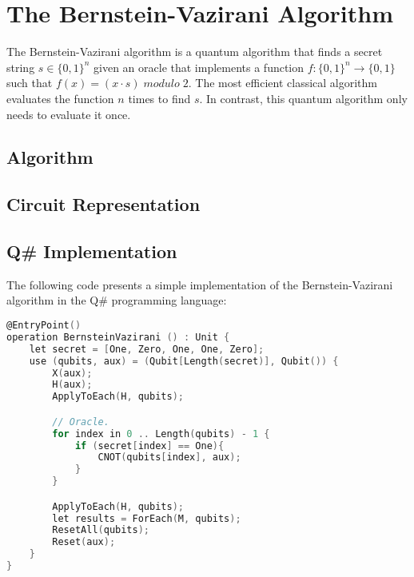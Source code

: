 %
%
\chapter {The Bernstein-Vazirani Algorithm}

The Bernstein-Vazirani algorithm\cite{BernsteinVazirani_1997} is a quantum algorithm that finds a secret string $s \in \{0, 1\}^n$ given an oracle that implements a function $f:\{0, 1\}^n \rightarrow \{0, 1\}$ such that $f(x) = (x \cdot s)\; modulo\; 2$. The most efficient classical algorithm evaluates the function $n$ times to find $s$. In contrast, this quantum algorithm only needs to evaluate it once.

\section{Algorithm}


\section{Circuit Representation}


\section{Q\# Implementation}

The following code presents a simple implementation of the Bernstein-Vazirani algorithm in the Q\# programming language:



\begin{lstlisting}[language=C]
@EntryPoint()
operation BernsteinVazirani () : Unit {
    let secret = [One, Zero, One, One, Zero];
    use (qubits, aux) = (Qubit[Length(secret)], Qubit()) {
        X(aux);
        H(aux);
        ApplyToEach(H, qubits);

        // Oracle.
        for index in 0 .. Length(qubits) - 1 {
            if (secret[index] == One){
                CNOT(qubits[index], aux);
            }
        }

        ApplyToEach(H, qubits);
        let results = ForEach(M, qubits);
        ResetAll(qubits);
        Reset(aux);
    }
}
\end{lstlisting}
